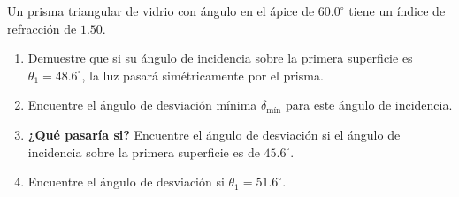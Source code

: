 \item Un prisma triangular de vidrio con ángulo en el ápice de $60.0^\circ$ tiene un índice de refracción de $1.50$.
\begin{enumerate}
    \item Demuestre que si su ángulo de incidencia sobre la primera superficie es $\theta_1 = 48.6^\circ$, la luz pasará simétricamente por el prisma.
    \item Encuentre el ángulo de desviación mínima $\delta_{\text{mín}}$ para este ángulo de incidencia.
    \item \textbf{¿Qué pasaría si?} Encuentre el ángulo de desviación si el ángulo de incidencia sobre la primera superficie es de $45.6^\circ$.
    \item Encuentre el ángulo de desviación si $\theta_1 = 51.6^\circ$.
\end{enumerate}